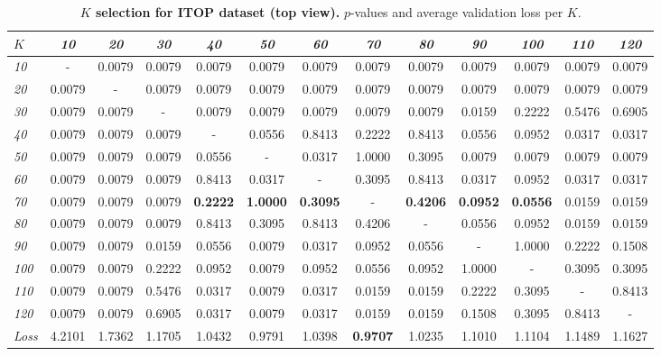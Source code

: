 \documentclass[review,12pt,3p]{elsarticle}
\begin{document}
\begin{table}[t]
\caption{\textbf{$K$ selection for ITOP dataset (top view).} $p$-values and average validation loss per $K$.}
\label{tab:statsKiTOPtview}
\scriptsize%
\begin{center}
\setlength{\tabcolsep}{0.2em} %
\begin{tabular}{|l|c c c c c c c c c c c c|}
\hline
 $K$ & \emph{10} & \emph{20}& \emph{30}& \emph{40}& \emph{50}& \emph{60}& \emph{70}& \emph{80}& \emph{90}& \emph{100}& \emph{110}& \emph{120} \\
 \hline
   \emph{10} & - & 0.0079 & 0.0079 & 0.0079 & 0.0079 & 0.0079 & 0.0079 & 0.0079 & 0.0079 & 0.0079 & 0.0079 & 0.0079  \\
   \emph{20} & 0.0079 & - & 0.0079 & 0.0079 & 0.0079 & 0.0079 & 0.0079 & 0.0079 & 0.0079 & 0.0079 & 0.0079 & 0.0079  \\
   \emph{30} & 0.0079 & 0.0079 & - & 0.0079 & 0.0079 & 0.0079 & 0.0079 & 0.0079 & 0.0159 & 0.2222 & 0.5476 & 0.6905  \\
   \emph{40} & 0.0079 & 0.0079 & 0.0079 & - & 0.0556 & 0.8413 & 0.2222 & 0.8413 & 0.0556 & 0.0952 & 0.0317 & 0.0317  \\
   \emph{50} & 0.0079 & 0.0079 & 0.0079 & 0.0556 & - & 0.0317 & 1.0000 & 0.3095 & 0.0079 & 0.0079 & 0.0079 & 0.0079  \\
   \emph{60} & 0.0079 & 0.0079 & 0.0079 & 0.8413 & 0.0317 & - & 0.3095 & 0.8413 & 0.0317 & 0.0952 & 0.0317 & 0.0317  \\
   \emph{70} & 0.0079 & 0.0079 & 0.0079 & \textbf{0.2222} & \textbf{1.0000} & \textbf{0.3095} & - & \textbf{0.4206} & \textbf{0.0952} & \textbf{0.0556} & 0.0159 & 0.0159  \\
   \emph{80} & 0.0079 & 0.0079 & 0.0079 & 0.8413 & 0.3095 & 0.8413 & 0.4206 & - & 0.0556 & 0.0952 & 0.0159 & 0.0159  \\
   \emph{90} & 0.0079 & 0.0079 & 0.0159 & 0.0556 & 0.0079 & 0.0317 & 0.0952 & 0.0556 & - & 1.0000 & 0.2222 & 0.1508  \\
   \emph{100} & 0.0079 & 0.0079 & 0.2222 & 0.0952 & 0.0079 & 0.0952 & 0.0556 & 0.0952 & 1.0000 & - & 0.3095 & 0.3095  \\
   \emph{110} & 0.0079 & 0.0079 & 0.5476 & 0.0317 & 0.0079 & 0.0317 & 0.0159 & 0.0159 & 0.2222 & 0.3095 & - & 0.8413  \\
  \emph{120} & 0.0079 & 0.0079 & 0.6905 & 0.0317 & 0.0079 & 0.0317 & 0.0159 & 0.0159 & 0.1508 & 0.3095 & 0.8413 & -  \\

\hline 
\hline
\textit{Loss} & 4.2101  &  1.7362 &   1.1705    &1.0432&    0.9791&    1.0398&    \textbf{0.9707}    &1.0235 &   1.1010  &  1.1104 &   1.1489  &  1.1627\\
\hline
\end{tabular} 
\end{center}
\end{table}
\end{document}
